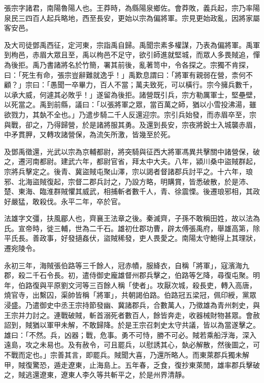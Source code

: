 
\begin{pinyinscope}
張宗字諸君，南陽魯陽人也。王莽時，為縣陽泉鄉佐。會莽敗，義兵起，宗乃率陽泉民三四百人起兵略地，西至長安，更始以宗為偏將軍。宗見更始政亂，因將家屬客安邑。

及大司徒鄧禹西征，定河東，宗詣禹自歸。禹聞宗素多權謀，乃表為偏將軍。禹軍到栒邑，赤眉大眾且至，禹以栒邑不足守，欲引師進就堅城，而眾人多畏賊追，憚為後拒。禹乃書諸將名於竹簡，署其前後，亂著笥中，令各探之。宗獨不肯探，曰：「死生有命，張宗豈辭難就逸乎！」禹歎息謂曰：「將軍有親弱在營，柰何不顧？」宗曰：「愚聞一卒畢力，百人不當；萬夫致死，可以橫行。宗今擁兵數千，以承大威，何遽其必敗乎！」遂留為後拒。諸營既引兵，宗方勒厲軍士，堅壘壁，以死當之。禹到前縣，議曰：「以張將軍之眾，當百萬之師，猶以小雪投沸湯，雖欲戮力，其埶不全也。」乃遣步騎二千人反還迎宗。宗引兵始發，而赤眉卒至，宗與戰，卻之，乃得歸營，於是諸將服其勇。及還到長安，宗夜將銳士入城襲赤眉，中矛貫胛，又轉攻諸營保，為流矢所激，皆幾至於死。

及鄧禹徵還，光武以宗為京輔都尉，將突騎與征西大將軍馮異共擊關中諸營保，破之，遷河南都尉。建武六年，都尉官省，拜太中大夫。八年，潁川桑中盜賊群起，宗將兵擊定之。後青、冀盜賊屯聚山澤，宗以謁者督諸郡兵討平之。十六年，琅邪、北海盜賊復起，宗督二郡兵討之，乃設方略，明購賞，皆悉破散，於是沛、楚、東海、臨淮群賊懼其威武，相捕斬者數千人，青、徐震慄。後遷琅邪相，其政好嚴猛，敢殺伐。永平二年，卒於官。

法雄字文彊，扶風郿人也，齊襄王法章之後。秦滅齊，子孫不敢稱田姓，故以法為氏。宣帝時，徙三輔，世為二千石。雄初仕郡功曹，辟太傅張禹府，舉雄高第，除平氏長。善政事，好發擿姦伏，盜賊稀發，吏人畏愛之。南陽太守鮑得上其理狀，遷宛陵令。

永初三年，海賊張伯路等三千餘人，冠赤幘，服絳衣，自稱「將軍」，寇濱海九郡，殺二千石令長。初，遣侍御史龐雄督州郡兵擊之，伯路等乞降，尋復屯聚。明年，伯路復與平原劉文河等三百餘人稱「使者」。攻厭次城，殺長吏，轉入高唐，燒官寺，出繫囚，渠帥皆稱「將軍」，共朝謁伯路。伯路冠五梁冠，佩印綬，黨眾浸盛。乃遣御史中丞王宗持節發幽、冀諸郡兵，合數萬人，乃徵雄為青州刺史，與王宗并力討之。連戰破賊，斬首溺死者數百人，餘皆奔走，收器械財物甚眾。會赦詔到，賊猶以軍甲未解，不敢歸降。於是王宗召刺史太守共議，皆以為當遂擊之。雄曰：「不然。兵，凶器；戰，危事。勇不可恃，勝不可必。賊若乘船浮海，深入遠島，攻之未易也。及有赦令，可且罷兵，以慰誘其心，埶必解散，然後圖之，可不戰而定也。」宗善其言，即罷兵。賊聞大喜，乃還所略人。而東萊郡兵獨未解甲，賊復驚恐，遁走遼東，止海島上。五年春，乏食，復抄東萊閒，雄率郡兵擊破之，賊逃還遼東，遼東人李久等共斬平之，於是州界清靜。


\end{pinyinscope}
